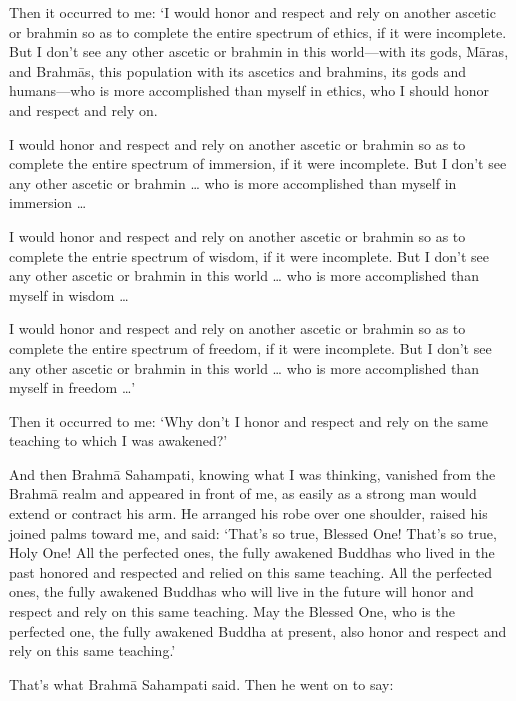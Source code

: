 \documentclass[12pt,openany]{book}%
\begin{document}
Then it occurred to me: ‘I would honor and respect and rely on another ascetic or brahmin so as to complete the entire spectrum of ethics, if it were incomplete. But I don’t see any other ascetic or brahmin in this world—with its gods, \textsanskrit{Māras}, and \textsanskrit{Brahmās}, this population with its ascetics and brahmins, its gods and humans—who is more accomplished than myself in ethics, who I should honor and respect and rely on. 

I would honor and respect and rely on another ascetic or brahmin so as to complete the entire spectrum of immersion, if it were incomplete. But I don’t see any other ascetic or brahmin … who is more accomplished than myself in immersion … 

I would honor and respect and rely on another ascetic or brahmin so as to complete the entrie spectrum of wisdom, if it were incomplete. But I don’t see any other ascetic or brahmin in this world … who is more accomplished than myself in wisdom … 

I would honor and respect and rely on another ascetic or brahmin so as to complete the entire spectrum of freedom, if it were incomplete. But I don’t see any other ascetic or brahmin in this world … who is more accomplished than myself in freedom …’ 

Then it occurred to me: ‘Why don’t I honor and respect and rely on the same teaching to which I was awakened?’ 

And then \textsanskrit{Brahmā} Sahampati, knowing what I was thinking, vanished from the \textsanskrit{Brahmā} realm and appeared in front of me, as easily as a strong man would extend or contract his arm. He arranged his robe over one shoulder, raised his joined palms toward me, and said: ‘That’s so true, Blessed One! That’s so true, Holy One! All the perfected ones, the fully awakened Buddhas who lived in the past honored and respected and relied on this same teaching. All the perfected ones, the fully awakened Buddhas who will live in the future will honor and respect and rely on this same teaching. May the Blessed One, who is the perfected one, the fully awakened Buddha at present, also honor and respect and rely on this same teaching.’ 

That’s what \textsanskrit{Brahmā} Sahampati said. Then he went on to say: 
\end{document}
